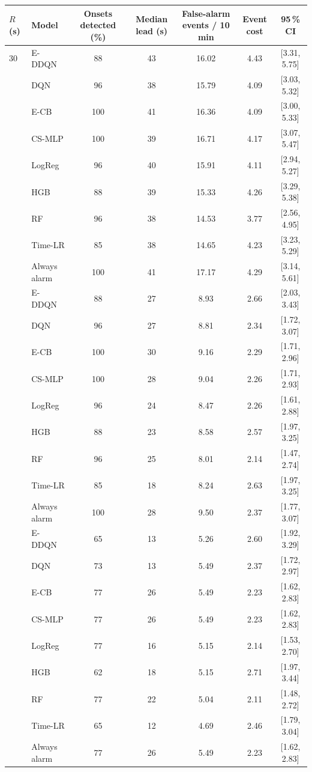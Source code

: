 \begin{tabular}{llccccc}
\toprule
$R$ (s) & Model & Onsets detected (\%) & Median lead (s) & False-alarm events / 10 min & Event cost & 95\,\% CI \\
\midrule
30 & E-DDQN & 88 & 43 & 16.02 & 4.43 & [3.31, 5.75] \\
 & DQN & 96 & 38 & 15.79 & 4.09 & [3.03, 5.32] \\
 & E-CB & 100 & 41 & 16.36 & 4.09 & [3.00, 5.33] \\
 & CS-MLP & 100 & 39 & 16.71 & 4.17 & [3.07, 5.47] \\
 & LogReg & 96 & 40 & 15.91 & 4.11 & [2.94, 5.27] \\
 & HGB & 88 & 39 & 15.33 & 4.26 & [3.29, 5.38] \\
 & RF & 96 & 38 & 14.53 & 3.77 & [2.56, 4.95] \\
 & Time-LR & 85 & 38 & 14.65 & 4.23 & [3.23, 5.29] \\
 & Always alarm & 100 & 41 & 17.17 & 4.29 & [3.14, 5.61] \\
\addlinespace[2pt]
60 & E-DDQN & 88 & 27 & 8.93 & 2.66 & [2.03, 3.43] \\
 & DQN & 96 & 27 & 8.81 & 2.34 & [1.72, 3.07] \\
 & E-CB & 100 & 30 & 9.16 & 2.29 & [1.71, 2.96] \\
 & CS-MLP & 100 & 28 & 9.04 & 2.26 & [1.71, 2.93] \\
 & LogReg & 96 & 24 & 8.47 & 2.26 & [1.61, 2.88] \\
 & HGB & 88 & 23 & 8.58 & 2.57 & [1.97, 3.25] \\
 & RF & 96 & 25 & 8.01 & 2.14 & [1.47, 2.74] \\
 & Time-LR & 85 & 18 & 8.24 & 2.63 & [1.97, 3.25] \\
 & Always alarm & 100 & 28 & 9.50 & 2.37 & [1.77, 3.07] \\
\addlinespace[2pt]
120 & E-DDQN & 65 & 13 & 5.26 & 2.60 & [1.92, 3.29] \\
 & DQN & 73 & 13 & 5.49 & 2.37 & [1.72, 2.97] \\
 & E-CB & 77 & 26 & 5.49 & 2.23 & [1.62, 2.83] \\
 & CS-MLP & 77 & 26 & 5.49 & 2.23 & [1.62, 2.83] \\
 & LogReg & 77 & 16 & 5.15 & 2.14 & [1.53, 2.70] \\
 & HGB & 62 & 18 & 5.15 & 2.71 & [1.97, 3.44] \\
 & RF & 77 & 22 & 5.04 & 2.11 & [1.48, 2.72] \\
 & Time-LR & 65 & 12 & 4.69 & 2.46 & [1.79, 3.04] \\
 & Always alarm & 77 & 26 & 5.49 & 2.23 & [1.62, 2.83] \\
\bottomrule
\end{tabular}
